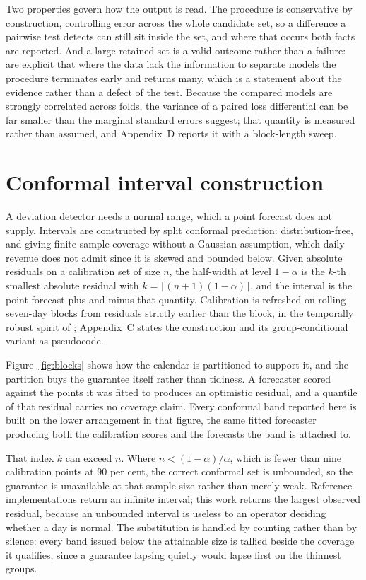 Two properties govern how the output is read. The procedure is conservative by construction,
controlling error across the whole candidate set, so a difference a pairwise test detects can
still sit inside the set, and where that occurs both facts are reported. And a large retained set
is a valid outcome rather than a failure: \citet{hansen_model_2011} are explicit that where the
data lack the information to separate models the procedure terminates early and returns many,
which is a statement about the evidence rather than a defect of the test. Because the compared
models are strongly correlated across folds, the variance of a paired loss differential can be far
smaller than the marginal standard errors suggest; that quantity is measured rather than assumed,
and Appendix~D reports it with a block-length sweep.

\section{Conformal interval construction}
\label{sec:conformal}

A deviation detector needs a normal range, which a point forecast does not supply. Intervals are
constructed by split conformal prediction: distribution-free, and giving finite-sample coverage
without a Gaussian assumption, which daily revenue does not admit since it is skewed and bounded
below. Given absolute residuals on a calibration set of size $n$, the half-width at level
$1-\alpha$ is the $k$-th smallest absolute residual with $k = \lceil (n+1)(1-\alpha) \rceil$, and
the interval is the point forecast plus and minus that quantity. Calibration is refreshed on
rolling seven-day blocks from residuals strictly earlier than the block, in the temporally robust
spirit of \citet{xu_conformal_2021}; Appendix~C states the construction and its group-conditional
variant as pseudocode.

Figure~\ref{fig:blocks} shows how the calendar is partitioned to support it, and the partition
buys the guarantee itself rather than tidiness. A forecaster scored against the points it was
fitted to produces an optimistic residual, and a quantile of that residual carries no coverage
claim. Every conformal band reported here is built on the lower arrangement in that figure, the
same fitted forecaster producing both the calibration scores and the forecasts the band is
attached to.

That index $k$ can exceed $n$. Where $n < (1-\alpha)/\alpha$, which is fewer than nine calibration
points at 90 per cent, the correct conformal set is unbounded, so the guarantee is unavailable at
that
sample size rather than merely weak. Reference implementations return an infinite interval; this
work returns the largest observed residual, because an unbounded interval is useless to an
operator deciding whether a day is normal. The substitution is handled by counting rather than by
silence: every band issued below the attainable size is tallied beside the coverage it qualifies,
since a guarantee lapsing quietly would lapse first on the thinnest groups.

